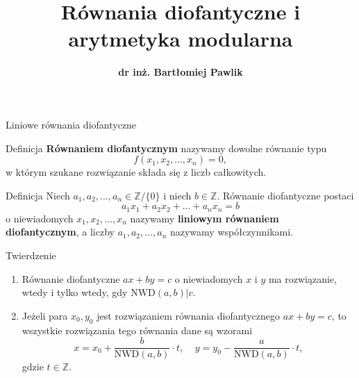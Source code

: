 \documentclass[a4paper,10pt]{beamer}
\title{\bf Równania diofantyczne i arytmetyka modularna}
\author[B. Pawlik]{\bf dr inż. Bartłomiej Pawlik}
\begin{document}
\begin{frame}
\titlepage
\end{frame}



\begin{frame}{Liniowe równania diofantyczne}
		
		\begin{block}{Definicja}
			{\bf Równaniem diofantycznym} nazywamy dowolne równanie typu $$f(x_1,x_2,\ldots,x_n)=0,$$ w którym szukane rozwiązanie składa się z liczb całkowitych. 
		\end{block}
		
		\begin{block}{Definicja}
			Niech $a_1,a_2,\ldots,a_n\in\mathbb{Z}/\{0\}$ i niech $b\in\mathbb{Z}$. Równanie diofantyczne postaci
			$$a_1x_1+a_2x_2+\ldots+a_nx_n=b$$
			o niewiadomych $x_1,x_2,\ldots,x_n$ nazywamy {\bf liniowym równaniem diofantycznym}, a liczby $a_1,a_2,\ldots,a_n$ nazywamy współczynnikami.
 		\end{block}
		
\end{frame}
	


	


\begin{frame}
	
	\begin{block}{Twierdzenie}
		\begin{enumerate}
			\item Równanie diofantyczne $ax+by=c$ o niewiadomych $x$ i $y$ ma rozwiązanie, wtedy i tylko wtedy, gdy  $\mbox{NWD}(a,b)|c$.
			\item Jeżeli para $x_0,y_0$ jest rozwiązaniem równania diofantycznego $ax+by=c$, to wszystkie rozwiązania tego równania dane są wzorami
			$$x=x_0+\frac{b}{\mbox{NWD}(a,b)}\cdot t,\ \ \ \ \ y=y_0-\frac{a}{\mbox{NWD}(a,b)}\cdot t,$$
			gdzie $t\in\mathbb{Z}$.
		\end{enumerate}
	\end{block}
	

\end{frame}


\end{document}
